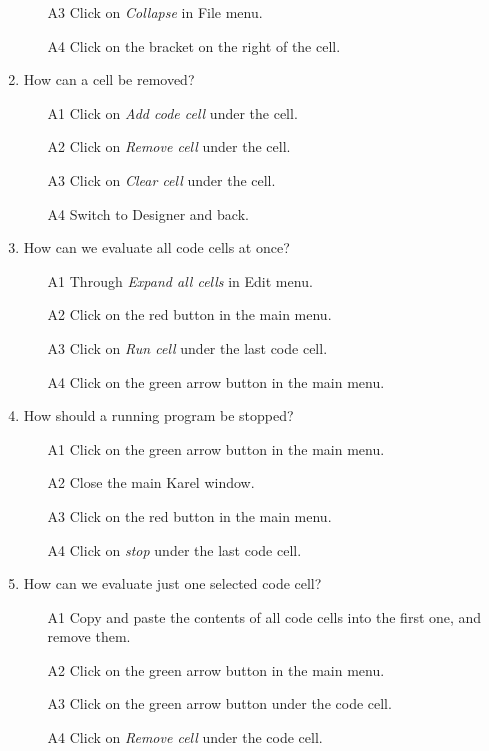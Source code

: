\begin{enumerate}
\begin{enumerate}
\item[A3] Click on {\em Collapse} in File menu.
\item[A4] Click on the bracket on the right of the cell.
\end{enumerate}
\item How can a cell be removed?
\begin{enumerate}
\item[A1] Click on {\em Add code cell} under the cell.
\item[A2] Click on {\em Remove cell} under the cell.
\item[A3] Click on {\em Clear cell} under the cell.
\item[A4] Switch to Designer and back.
\end{enumerate}
\item How can we evaluate all code cells at once?
\begin{enumerate}
\item[A1] Through {\em Expand all cells} in Edit menu.
\item[A2] Click on the red button in the main menu.
\item[A3] Click on {\em Run cell} under the last code cell.
\item[A4] Click on the green arrow button in the main menu.
\end{enumerate}
\item How should a running program be stopped?
\begin{enumerate}
\item[A1] Click on the green arrow button in the main menu.
\item[A2] Close the main Karel window.
\item[A3] Click on the red button in the main menu.
\item[A4] Click on {\em stop} under the last code cell.
\end{enumerate}
\item How can we evaluate just one selected code cell?
\begin{enumerate}
\item[A1] Copy and paste the contents of all 
          code cells into the first one, and remove them.
\item[A2] Click on the green arrow button in the main menu. 
\item[A3] Click on the green arrow button under the code cell.
\item[A4] Click on {\em Remove cell} under the code cell.
\end{enumerate}
\end{enumerate}


